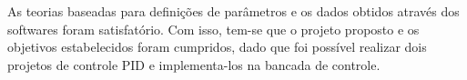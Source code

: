 \documentclass[conference]{IEEEtran}
\begin{document}
As teorias baseadas para definições de parâmetros e os dados obtidos através dos softwares foram satisfatório. Com isso, tem-se que o projeto proposto e os objetivos estabelecidos foram cumpridos, dado que foi possível realizar dois projetos de controle PID e implementa-los na bancada de controle.


\addtolength{\textheight}{-12cm}


\end{document}
